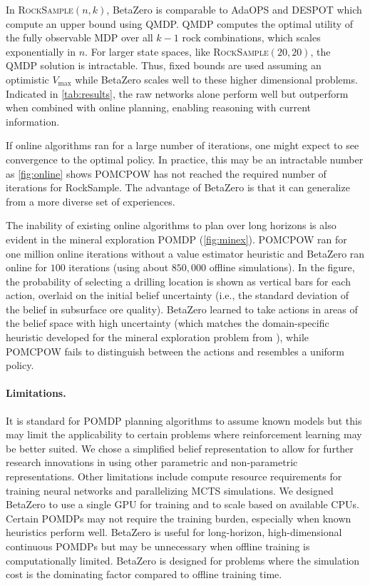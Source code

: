 In \textsc{RockSample}$(n,k)$, BetaZero is comparable to AdaOPS and DESPOT which compute an upper bound using QMDP.
QMDP computes the optimal utility of the fully observable MDP over all $k-1$ rock combinations, which scales exponentially in $n$.
For larger state spaces, like \textsc{RockSample}$(20,20)$, the QMDP solution is intractable.
Thus, fixed bounds are used assuming an optimistic $V_\text{max}$ \cite{adaops2021review}
while BetaZero scales well to these higher dimensional problems. %
Indicated in \cref{tab:results}, the raw networks alone perform well but outperform when combined with online planning, enabling reasoning with current information.


If online algorithms ran for a large number of iterations, one might expect to see convergence to the optimal policy.
In practice, this may be an intractable number as \cref{fig:online} shows POMCPOW has not reached the required number of iterations for RockSample.
The advantage of BetaZero is that it can generalize from a more diverse set of experiences.


The inability of existing online algorithms to plan over long horizons is also evident in the mineral exploration POMDP (\cref{fig:minex}).
POMCPOW ran for one million online iterations without a value estimator heuristic and BetaZero ran online for $100$ iterations (using about $850{,}000$ offline simulations).
In the figure, the probability of selecting a drilling location is shown as vertical bars for each action, overlaid on the initial belief uncertainty (i.e., the standard deviation of the belief in subsurface ore quality).
BetaZero learned to take actions in areas of the belief space with high uncertainty (which matches the domain-specific heuristic developed for the mineral exploration problem from \citeauthor{mern2023intelligent}), while POMCPOW fails to distinguish between the actions and resembles a uniform policy.

\paragraph{Limitations.}
It is standard for POMDP planning algorithms to assume known models but this may limit the applicability to certain problems where reinforcement learning may be better suited.
We chose a simplified belief representation to allow for further research innovations in using other parametric and non-parametric representations.
Other limitations include compute resource requirements for training neural networks and parallelizing MCTS simulations.
We designed BetaZero to use a single GPU for training and to scale based on available CPUs.
Certain POMDPs may not require the training burden, especially when known heuristics perform well.
BetaZero is useful for long-horizon, high-dimensional continuous POMDPs but may be unnecessary when offline training is computationally limited.
BetaZero is designed for problems where the simulation cost is the dominating factor compared to offline training time.

